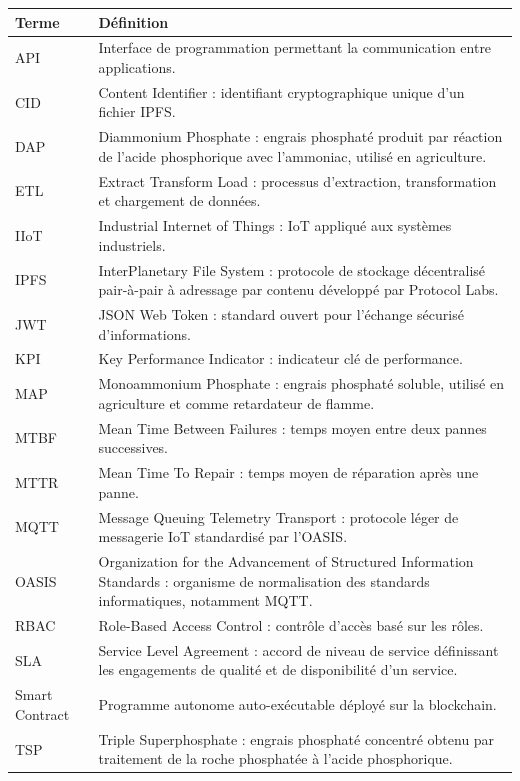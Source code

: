 \documentclass[12pt, a4paper, oneside]{report}
\begin{document}
\begin{longtable}{L{3.5cm} L{9cm}}
  \toprule
  \textbf{Terme} & \textbf{Définition} \\
  \midrule
  \endhead
  \bottomrule
  \endfoot
         API              & Interface de programmation permettant la communication entre applications. \\
         CID              & Content Identifier : identifiant cryptographique unique d'un fichier IPFS. \\
  DAP              & Diammonium Phosphate : engrais phosphaté produit par réaction de l'acide phosphorique avec l'ammoniac, utilisé en agriculture. \\
         ETL              & Extract Transform Load : processus d'extraction, transformation et chargement de données. \\
  IIoT             & Industrial Internet of Things : IoT appliqué aux systèmes industriels. \\
         IPFS             & InterPlanetary File System : protocole de stockage décentralisé pair-à-pair à adressage par contenu développé par Protocol Labs. \\
  JWT              & JSON Web Token : standard ouvert pour l'échange sécurisé d'informations. \\
         KPI              & Key Performance Indicator : indicateur clé de performance. \\
  MAP              & Monoammonium Phosphate : engrais phosphaté soluble, utilisé en agriculture et comme retardateur de flamme. \\
         MTBF             & Mean Time Between Failures : temps moyen entre deux pannes successives. \\
  MTTR             & Mean Time To Repair : temps moyen de réparation après une panne. \\
         MQTT             & Message Queuing Telemetry Transport : protocole léger de messagerie IoT standardisé par l'OASIS. \\
  OASIS            & Organization for the Advancement of Structured Information Standards : organisme de normalisation des standards informatiques, notamment MQTT. \\
         RBAC             & Role-Based Access Control : contrôle d'accès basé sur les rôles. \\
  SLA              & Service Level Agreement : accord de niveau de service définissant les engagements de qualité et de disponibilité d'un service. \\
         Smart Contract   & Programme autonome auto-exécutable déployé sur la blockchain. \\
  TSP              & Triple Superphosphate : engrais phosphaté concentré obtenu par traitement de la roche phosphatée à l'acide phosphorique. \\
\end{longtable}
\end{document}
